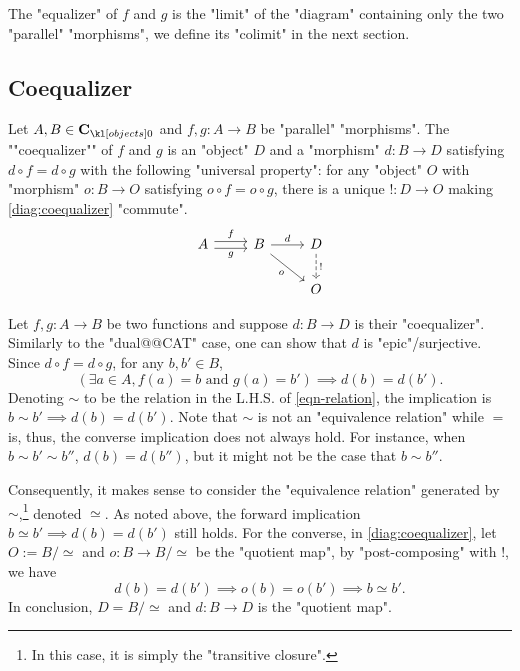 \documentclass[main.tex]{subfiles}
\begin{document}
The "equalizer" of $f$ and $g$ is the "limit" of the "diagram" containing only the two "parallel" "morphisms", we define its "colimit" in the next section.
\subsection{Coequalizer}

\begin{defn}[Coequalizer]
    Let $A, B \in \obj{\mathbf{C}}$ and $f,g:A\rightarrow B$ be "parallel" "morphisms". \AP The ""coequalizer"" of $f$ and $g$ is an "object" $D$ and a "morphism" $d:B\rightarrow D$ satisfying $d\circ f = d \circ g$ with the following "universal property": for any "object" $O$ with "morphism" $o:B\rightarrow O$ satisfying $o\circ f = o \circ g$, there is a unique $!: D \rightarrow O$ making \eqref{diag:coequalizer} "commute".
    \begin{equation}\label{diag:coequalizer}
        \begin{tikzcd}
            A \arrow[r, "f", shift left] \arrow[r, "g"', shift right] & B \arrow[r, "d"] \arrow[rd, "o"'] & D \arrow[d, "!", dashed] \\& & O
        \end{tikzcd}
    \end{equation}
\end{defn}
\begin{exmp}[$\catSet$]
    Let $f,g:A\rightarrow B$ be two functions and suppose $d:B \rightarrow D$ is their "coequalizer". Similarly to the "dual@@CAT" case, one can show that $d$ is "epic"/surjective. Since $d\circ f = d \circ g$, for any $b, b' \in B$,
    \begin{equation}\label{eqn-relation}\tag{$*$}
        \left( \exists a \in A, f(a) = b\text{ and } g(a) = b' \right) \implies d(b) =d(b').
    \end{equation} Denoting $\sim$ to be the relation in the L.H.S. of \eqref{eqn-relation}, the implication is $b \sim b' \implies d(b) = d(b')$. Note that $\sim$ is not an "equivalence relation" while $=$ is, thus, the converse implication does not always hold. For instance, when $b\sim b'\sim b''$, $d(b) = d(b'')$, but it might not be the case that $b\sim b''$.

    Consequently, it makes sense to consider the "equivalence relation" generated by $\sim$,\footnote{In this case, it is simply the "transitive closure".} denoted $\simeq$. As noted above, the forward implication $b\simeq b' \implies d(b)= d(b')$ still holds. For the converse, in \eqref{diag:coequalizer}, let $O:= B/{\simeq}$ and $o: B \rightarrow B/{\simeq}$ be the "quotient map", by "post-composing" with $!$, we have \[d(b) = d(b') \implies o(b) = o(b') \implies b \simeq b'.\]
    In conclusion, $D= B/{\simeq}$ and $d:B \rightarrow D$ is the "quotient map".
\end{exmp}
\end{document}
